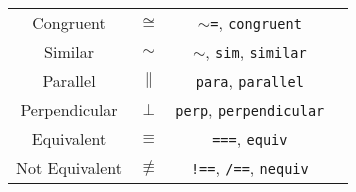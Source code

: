 \documentclass{article}
\newcommand{\tttilde}{{\footnotesize $\sim$}}
\begin{document}
\begin{table}[!h]
\begin{tabular}{|c|c|c|l|}
      \hline
      Congruent & \( \cong \) & \texttt{\tttilde =}, \texttt{congruent} & \\
      Similar & \( \sim \) & \texttt{\tttilde}, \texttt{sim}, \texttt{similar} & \\
      Parallel & \( \parallel \) & \texttt{para}, \texttt{parallel} & \\
      Perpendicular & \( \perp \) & \texttt{perp}, \texttt{perpendicular} & \\
      \hline
      Equivalent & \( \equiv \) & \texttt{===}, \texttt{equiv} & \\
      Not Equivalent & \( \not\equiv \) & \texttt{!==}, \texttt{/==}, \texttt{nequiv} & \\
      \hline
    \end{tabular}
  \end{table}

  \newpage
\end{document}
